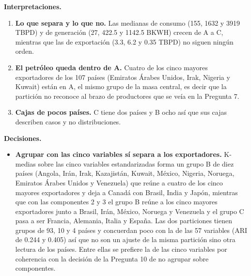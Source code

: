 \documentclass[oneside, openany, fontset=libertinus]{mitthesis}
\providecommand{\tightlist}{\setlength{\itemsep}{0pt}\setlength{\parskip}{0pt}}
\begin{document}
\begin{notas}

\textbf{Interpretaciones.}

\begin{enumerate}
\def\labelenumi{\alph{enumi}.}
\tightlist
\item
  \textbf{Lo que separa y lo que no.} Las medianas de consumo (155, 1632
  y 3919 TBPD) y de generación (27, 422.5 y 1142.5 BKWH) crecen de A a
  C, mientras que las de exportación (3.3, 6.2 y 0.35 TBPD) no siguen
  ningún orden.
\item
  \textbf{El petróleo queda dentro de A.} Cuatro de los cinco mayores
  exportadores de los 107 países (Emiratos Árabes Unidos, Irak, Nigeria
  y Kuwait) están en A, el mismo grupo de la masa central, es decir que
  la partición no reconoce al brazo de productores que se veía en la
  Pregunta 7.
\item
  \textbf{Cajas de pocos países.} C tiene dos países y B ocho así que
  sus cajas describen casos y no distribuciones.
\end{enumerate}

\textbf{Decisiones.}

\begin{itemize}
\item
  \textbf{Agrupar con las cinco variables sí separa a los exportadores.}
  K-medias sobre las cinco variables estandarizadas forma un grupo B de
  diez países (Angola, Irán, Irak, Kazajistán, Kuwait, México, Nigeria,
  Noruega, Emiratos Árabes Unidos y Venezuela) que reúne a cuatro de los
  cinco mayores exportadores y deja a Canadá con Brasil, India y Japón,
  mientras que con las componentes 2 y 3 el grupo B reúne a los cinco
  mayores exportadores junto a Brasil, Irán, México, Noruega y Venezuela
  y el grupo C pasa a ser Francia, Alemania, Italia y España. Las dos
  particiones tienen grupos de 93, 10 y 4 países y concuerdan poco con
  la de las 57 variables (ARI de 0.244 y 0.405) así que no son un
  ajuste de la misma partición sino otra lectura de los países. Entre
  ellas se prefiere la de las cinco variables por coherencia con la
  decisión de la Pregunta 10 de no agrupar sobre componentes.


\end{itemize}
\end{notas}
\end{document}
